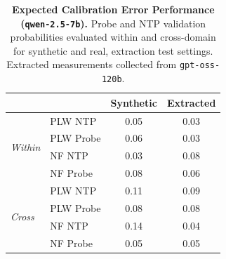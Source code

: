 \begin{table}[ht]
\centering
\begin{tabular}{ll cc}
\toprule
& & Synthetic & Extracted \\
\midrule
\multirow{4}{*}{\textit{Within}}
& PLW NTP & 0.05 & 0.03 \\
& PLW Probe & 0.06 & 0.03 \\
& NF NTP & 0.03 & 0.08 \\
& NF Probe & 0.08 & 0.06 \\
\midrule
\multirow{4}{*}{\textit{Cross}}
& PLW NTP & 0.11 & 0.09 \\
& PLW Probe & 0.08 & 0.08 \\
& NF NTP & 0.14 & 0.04 \\
& NF Probe & 0.05 & 0.05 \\
\bottomrule
\end{tabular}
\caption{\textbf{Expected Calibration Error Performance (\texttt{qwen-2.5-7b}).} Probe and NTP validation probabilities evaluated within and cross-domain for synthetic and real, extraction test settings. Extracted measurements collected from \texttt{gpt-oss-120b}.}
\label{tab:qwen-2.5-7b-gpt-oss-120b}
\end{table}

